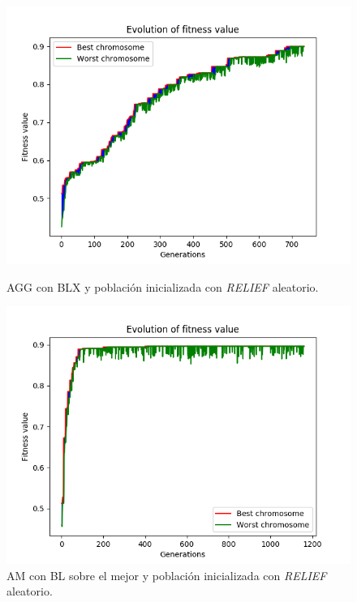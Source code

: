 \documentclass[11pt,a4paper]{article}
\begin{document}
\begin{figure}[H]
\centering
\begin{minipage}{.5\textwidth}
	\centering
	\includegraphics[scale=0.43]{img/agg-blx-relief-ionosphere.png}
	\caption{AGG con BLX y población inicializada con \textit{RELIEF} aleatorio.}
\end{minipage}%
\begin{minipage}{.5\textwidth}
	\centering
	\includegraphics[scale=0.43]{img/am-best-relief-ionosphere.png}
	\caption{AM con BL sobre el mejor y población inicializada con \textit{RELIEF} aleatorio.}
\end{minipage}
\end{figure}
\end{document}
